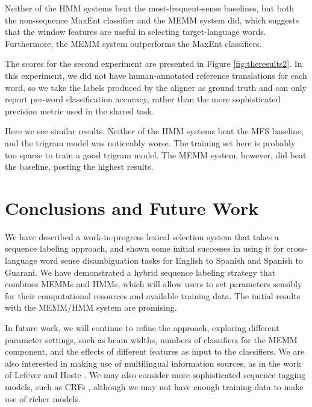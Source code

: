 \documentclass[11pt]{article}
\begin{document}
Neither of the HMM systems beat the most-frequent-sense baselines, but both the
non-sequence MaxEnt classifier and the MEMM system did, which suggests that the
window features are useful in selecting target-language words. Furthermore, the
MEMM system outperforms the MaxEnt classifiers.

The scores for the second experiment are presented in Figure
\ref{fig:theresults2}. In this experiment, we did not have human-annotated
reference translations for each word, so we take the labels produced by the
aligner as ground truth and can only report per-word classification accuracy,
rather than the more sophisticated precision metric used in the shared task.

Here we see similar results. Neither of the HMM systems beat the MFS baseline,
and the trigram model was noticeably worse. The training set here is probably
too sparse to train a good trigram model. The MEMM system, however, did beat
the baseline, posting the highest results.



\section{Conclusions and Future Work}
We have described a work-in-progress lexical selection system that takes a
sequence labeling approach, and shown some initial successes in using it for
cross-language word sense disambiguation tasks for English to Spanish and
Spanish to Guarani.  We have demonstrated a hybrid sequence labeling strategy
that combines MEMMs and HMMs, which will allow users to set parameters sensibly
for their computational resources and available training data. The initial
results with the MEMM/HMM system are promising.

In future work, we will continue to refine the approach, exploring different
parameter settings, such as beam widths, numbers of classifiers for the MEMM
component, and the effects of different features as input to the classifiers.
We are also interested in making use of multilingual information sources,
as in the work of Lefever and Hoste
. We may also consider more
sophisticated sequence tagging models, such as CRFs
\cite{DBLP:conf/icml/LaffertyMP01}, although we may not have enough training
data to make use of richer models.
\end{document}

